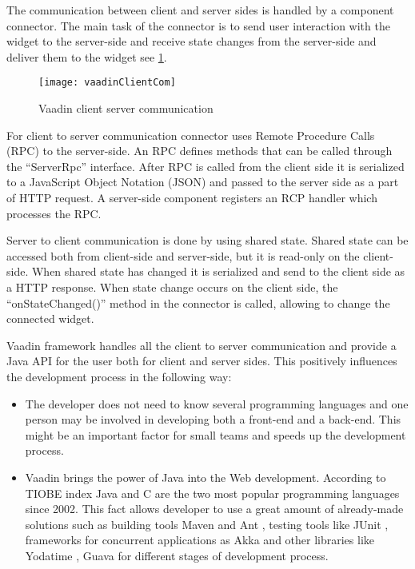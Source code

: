    The communication between client and server sides is handled by a component
   connector. The main task of the connector is to send user interaction
   with the widget to the server-side and receive state changes from the server-side 
   and deliver them to the widget see \ref{fig:vaadinClientCom}. 
    
	  \begin{figure}
      	\texttt{[image: vaadinClientCom]}
      	\caption{Vaadin client server communication}
      	\label{fig:vaadinClientCom}
      \end{figure}
      
   For client to server communication connector uses Remote Procedure
   Calls (RPC) to the server-side. An RPC defines methods that can be called
   through the ``ServerRpc'' interface. After RPC is called from the client side
   it is serialized to a JavaScript Object Notation (JSON) and passed to the
   server side as a part of HTTP request. A server-side component registers an
   RCP handler which processes the RPC. 
   
   Server to client communication is done by using shared
   state. Shared state can be accessed both from client-side and server-side,
   but it is read-only on the client-side. When shared state has changed it is
   serialized and send to the client side as a HTTP response. When state change
   occurs on the client side, the ``onStateChanged()'' method in the connector is called,
   allowing to change the connected widget.
   
   
  
   Vaadin framework handles all the client to server communication and provide
   a Java API for the user both for client and server sides. This positively
    influences the development process in the following way:
   \begin{itemize}
     \item The developer does not need to know several programming languages and one
    person may be involved in developing both a front-end and a back-end.
    This might be an important factor for small teams and speeds up the development
    process.
   \item Vaadin brings the power of Java into the Web development. According to
    TIOBE index \cite{tiobeIndex} Java and C are the two most popular programming
    languages since 2002. This fact allows developer to use a great amount of
    already-made solutions such as building tools Maven \cite{maven} and Ant
    \cite{ant}, testing tools like JUnit \cite{junit}, frameworks for concurrent
    applications as Akka \cite{akka} \cite{akkaUseCases} and other libraries
    like Yodatime \cite{yodatime}, Guava \cite{guava} for different stages of development process.
  \end{itemize}  		
		
